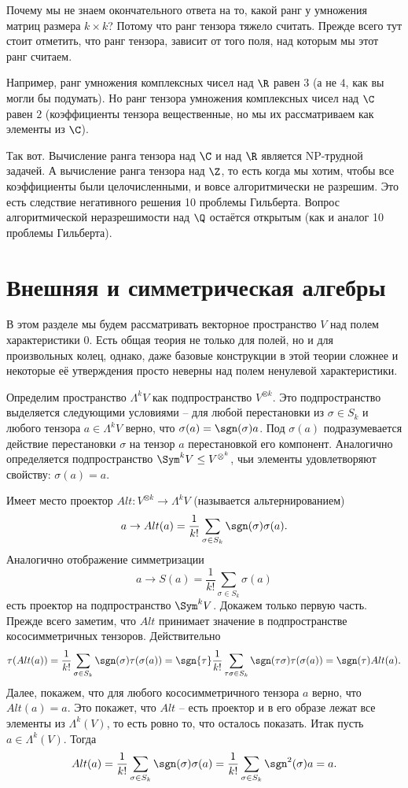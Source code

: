 Почему мы не знаем окончательного ответа на то, какой ранг у умножения матриц размера $k\times k$? Потому что ранг тензора тяжело считать. Прежде всего тут стоит отметить, что ранг тензора, зависит от того поля, над которым мы этот ранг считаем. 

Например, ранг умножения комплексных чисел над $\R$ равен $3$ (а не $4$, как вы могли бы подумать). Но ранг тензора умножения комплексных чисел над $\C$ равен $2$ (коэффициенты тензора вещественные, но мы их  рассматриваем как элементы из $\C$).  

Так вот. Вычисление ранга тензора над $\C$ и над $\R$ является NP-трудной задачей. А вычисление ранга тензора над $\Z$, то есть когда мы хотим, чтобы все коэффициенты были целочисленными, и вовсе алгоритмически не разрешим. Это есть следствие негативного решения 10 проблемы Гильберта. Вопрос алгоритмической неразрешимости над $\Q$ остаётся открытым (как и аналог 10 проблемы Гильберта).




\section{Внешняя и симметрическая алгебры}

В этом разделе мы будем рассматривать векторное пространство $V$ над полем характеристики $0$. Есть общая теория не только для полей, но и для произвольных колец, однако, даже базовые конструкции в этой теории сложнее и некоторые её утверждения просто неверны над полем ненулевой характеристики.

\dfn Определим пространство $\Lambda^k V$ как подпространство $V^{\otimes k}$. Это подпространство выделяется следующими условиями -- для любой перестановки из $\sigma \in S_k$ и любого тензора $a\in \Lambda^k V$ верно, что $\sigma(a)=\sgn(\sigma)a$. Под $\sigma(a)$ подразумевается действие перестановки $\sigma$ на тензор $a$ перестановкой его компонент. Аналогично определяется подпространство $\Sym^k V \leq V^{\otimes^k}$, чьи элементы удовлетворяют свойству: $\sigma(a)=a$.
\edfn

\lm Имеет место проектор $Alt \colon V^{\otimes k} \to \Lambda^k V$ (называется альтернированием) 
$$a \to Alt(a)=\frac{1}{k!} \sum_{\sigma \in S_k} \sgn (\sigma) \sigma(a).$$
Аналогично отображение  симметризации
$$ a \to S(a)= \frac{1}{k!} \sum_{\sigma \in S_k} \sigma(a)$$
есть проектор на подпространство $\Sym^k V$.
\proof Докажем только первую часть. Прежде всего заметим, что $Alt$ принимает значение в подпространстве кососимметричных тензоров. Действительно 
$$\tau(Alt(a))=\frac{1}{k!}\sum_{\sigma \in S_k}\sgn(\sigma) \tau(\sigma(a))= \sgn{\tau} \frac{1}{k!}\sum_{\tau\sigma \in S_k} \sgn(\tau\sigma) \tau(\sigma(a))=\sgn(\tau) Alt(a).$$
Далее, покажем, что для любого кососимметричного тензора $a$ верно, что $Alt(a)=a$. Это покажет, что $Alt$ -- есть проектор и в его образе лежат все элементы из $\Lambda^k(V)$, то есть ровно то, что осталось показать. Итак пусть $a\in \Lambda^k(V)$. Тогда 
$$Alt(a)=\frac{1}{k!} \sum_{\sigma \in S_k} \sgn (\sigma) \sigma(a)=\frac{1}{k!} \sum_{\sigma \in S_k} \sgn^2(\sigma) a=a.$$
\endproof
\elm

